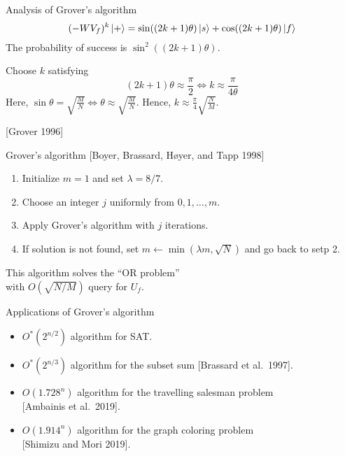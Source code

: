\documentclass{beamer}
\newcommand\emm[1]{\textcolor{redorange}{{#1}}}
\begin{document}
\begin{frame}{Analysis of Grover's algorithm}
\begin{equation*}
(-WV_f)^k \ket{+} = \sin((2k + 1)\theta)\ket{s} + \cos((2k+1)\theta)\ket{f}
\end{equation*}
The probability of success is \emm{$\sin^2((2k+1)\theta)$}.

\vspace{1em}
Choose $k$ satisfying
\begin{equation*}
(2k+1)\theta \approx \frac{\pi}2
\iff k \approx \frac{\pi}{4\theta}
\end{equation*}
Here, $\sin\theta = \sqrt{\frac{M}{N}} \iff \theta\approx\sqrt{\frac{M}{N}}$.
Hence, $k\approx \frac{\pi}4\sqrt{\frac{N}{M}}$.

\vspace{2em}
[Grover 1996]
\end{frame}

\begin{frame}{Grover's algorithm}
[Boyer, Brassard, H\o yer, and Tapp 1998]
\begin{enumerate}
\item Initialize $m = 1$ and set $\lambda = 8/7$.
\item Choose an integer $j$ uniformly from $0,1,\dotsc, m$.
\item Apply Grover's algorithm with $j$ iterations.
\item If solution is not found, set $m\leftarrow\min(\lambda m, \sqrt{N})$ and go back to setp 2.
\end{enumerate}

\vspace{3em}
\centering
This algorithm solves the ``OR problem''\\
 with $O(\sqrt{N/M})$ query for $U_f$.
\end{frame}

\begin{frame}{Applications of Grover's algorithm}
\begin{itemize}
\setlength{\itemsep}{2em}
\item $O^*(2^{n/2})$ algorithm for SAT.
\item $O^*(2^{n/3})$ algorithm for the subset sum [Brassard et al.\ 1997].
\item $O(1.728^{n})$ algorithm for the travelling salesman problem\\
{[Ambainis et al.\ 2019]}.
\item $O(1.914^{n})$ algorithm for the graph coloring problem\\
{[Shimizu and Mori 2019]}.
\end{itemize}
\end{frame}
\end{document}
